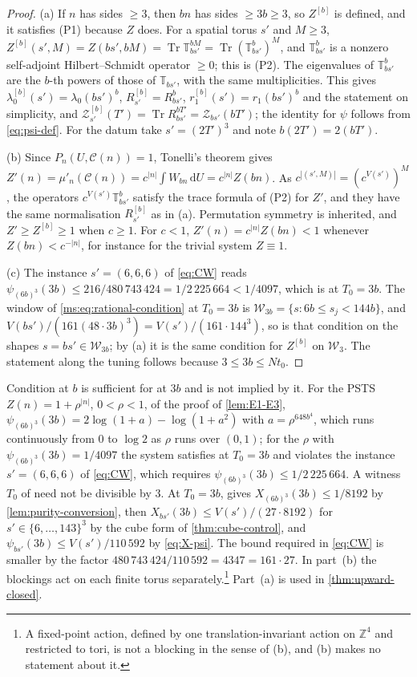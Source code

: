 \documentclass[11pt,a4paper]{amsart}
\theoremstyle{definition}
\theoremstyle{remark}
\numberwithin{equation}{section}
\DeclareMathOperator{\Tr}{Tr}        %
\newcommand{\Z}{\mathbb{Z}}          %
\newcommand{\Wwin}{\mathcal{W}}      %
\newcommand{\dd}{\,\mathrm{d}}             %
\newcommand{\PSTS}{\textup{PSTS}}          %
\newcommand{\TT}{\mathbb{T}}               %
\newcommand{\Zc}{\mathcal{Z}}              %
\newcommand{\Zs}[2]{\Zc_{#1}(#2)}          %
\newcommand{\XT}[2]{X_{#1}(#2)}            %
\newcommand{\psiT}[2]{\psi_{#1}(#2)}       %
\newcommand{\Vol}[1]{V(#1)}                %
\newcommand{\lzero}{\lambda_0}             %
\newcommand{\dconst}{\frac{1}{4097}}       %
\newcommand{\xconst}{\frac{1}{8192}}       %
\newcommand{\dconstinl}{1/4097}            %
\newcommand{\xconstinl}{1/8192}            %
\newcommand{\Mcirc}{\text{\upshape(M$^{\circ}$)}}   %
\newcommand{\CW}{\text{\upshape(CW)}}               %
\newcommand{\tzero}{t_0}                   %
\begin{document}
\begin{proof}
(a) If $n$ has sides $\ge3$, then $bn$ has sides $\ge3b\ge3$, so $Z^{[b]}$ is defined, and it satisfies (P1) because $Z$ does. For a spatial torus $s'$ and $M\ge3$, $Z^{[b]}(s',M)=Z(bs',bM)=\Tr\TT_{bs'}^{bM}=\Tr(\TT_{bs'}^b)^M$, and $\TT_{bs'}^b$ is a nonzero self-adjoint Hilbert--Schmidt operator $\ge0$; this is (P2). The eigenvalues of $\TT_{bs'}^b$ are the $b$-th powers of those of $\TT_{bs'}$, with the same multiplicities. This gives $\lzero^{[b]}(s')=\lzero(bs')^b$, $R^{[b]}_{s'}=R_{bs'}^b$, $r_1^{[b]}(s')=r_1(bs')^b$ and the statement on simplicity, and $\Zc^{[b]}_{s'}(T')=\Tr R_{bs'}^{bT'}=\Zs{bs'}{bT'}$; the identity for $\psi$ follows from \eqref{eq:psi-def}. For the datum take $s'=(2T')^3$ and note $b(2T')=2(bT')$.

(b) Since $P_n(U,\mathcal{C}(n))=1$, Tonelli's theorem gives $Z'(n)=\mu'_n(\mathcal{C}(n))=c^{|n|}\int W_{bn}\dd U=c^{|n|}Z(bn)$. As $c^{|(s',M)|}=(c^{\Vol{s'}})^M$, the operators $c^{\Vol{s'}}\TT_{bs'}^b$ satisfy the trace formula of (P2) for $Z'$, and they have the same normalisation $R^{[b]}_{s'}$ as in (a). Permutation symmetry is inherited, and $Z'\ge Z^{[b]}\ge1$ when $c\ge1$. For $c<1$, $Z'(n)=c^{|n|}Z(bn)<1$ whenever $Z(bn)<c^{-|n|}$, for instance for the trivial system $Z\equiv1$.

(c) The instance $s'=(6,6,6)$ of \eqref{eq:CW} reads $\psiT{(6b)^3}{3b}\le216/480\,743\,424=1/2\,225\,664<\dconstinl$, which is \Mcirc{} at $T_0=3b$. The window of \eqref{ms:eq:rational-condition} at $T_0=3b$ is $\Wwin_{3b}=\{s:6b\le s_j<144b\}$, and $\Vol{bs'}/(161(48\cdot3b)^3)=\Vol{s'}/(161\cdot144^3)$, so \CW{} is that condition on the shapes $s=bs'\in\Wwin_{3b}$; by (a) it is the same condition for $Z^{[b]}$ on $\Wwin_3$. The statement along the tuning follows because $3\le3b\le N\tzero$.
\end{proof}

Condition \CW{} at $b$ is sufficient for \Mcirc{} at $3b$ and is not implied by it. For the \PSTS{} $Z(n)=1+\rho^{|n|}$, $0<\rho<1$, of the proof of \cref{lem:E1-E3}, $\psiT{(6b)^3}{3b}=2\log(1+a)-\log(1+a^2)$ with $a=\rho^{648b^4}$, which runs continuously from $0$ to $\log2$ as $\rho$ runs over $(0,1)$; for the $\rho$ with $\psiT{(6b)^3}{3b}=\dconstinl$ the system satisfies \Mcirc{} at $T_0=3b$ and violates the instance $s'=(6,6,6)$ of \eqref{eq:CW}, which requires $\psiT{(6b)^3}{3b}\le1/2\,225\,664$. A witness $T_0$ of \Mcirc{} need not be divisible by $3$. At $T_0=3b$, \Mcirc{} gives $\XT{(6b)^3}{3b}\le\xconstinl$ by \cref{lem:purity-conversion}, then $\XT{bs'}{3b}\le\Vol{s'}/(27\cdot8192)$ for $s'\in\{6,\dots,143\}^3$ by the cube form of \cref{thm:cube-control}, and $\psiT{bs'}{3b}\le\Vol{s'}/110\,592$ by \eqref{eq:X-psi}. The bound required in \eqref{eq:CW} is smaller by the factor $480\,743\,424/110\,592=4347=161\cdot27$. In part~(b) the blockings act on each finite torus separately.\footnote{A fixed-point action, defined by one translation-invariant action on $\Z^4$ and restricted to tori, is not a blocking in the sense of (b), and (b) makes no statement about it.} Part~(a) is used in \cref{thm:upward-closed}.
\end{document}
